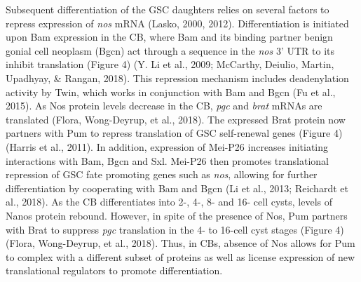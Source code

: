 \documentclass[12pt,oneside]{reedthesis}
\begin{document}
Subsequent differentiation of the GSC daughters relies on several
factors to repress expression of \emph{nos} mRNA (Lasko, 2000, 2012). Differentiation is initiated upon Bam expression in the
CB, where Bam and its binding partner benign gonial cell neoplasm (Bgcn)
act through a sequence in the \emph{nos} 3' UTR to its inhibit translation
(Figure 4) (Y. Li et al., 2009; McCarthy, Deiulio, Martin, Upadhyay, \& Rangan, 2018). This repression mechanism
includes deadenylation activity by Twin, which works in conjunction with
Bam and Bgcn (Fu et al., 2015). As Nos protein levels decrease in the CB,
\emph{pgc} and \emph{brat} mRNAs are translated (Flora, Wong-Deyrup, et al., 2018). The expressed
Brat protein now partners with Pum to repress translation of GSC
self-renewal genes (Figure 4) (Harris et al., 2011). In addition, expression
of Mei-P26 increases initiating interactions with Bam, Bgcn and Sxl.
Mei-P26 then promotes translational repression of GSC fate promoting
genes such as \emph{nos}, allowing for further differentiation by cooperating
with Bam and Bgcn (Li et al., 2013; Reichardt et al., 2018). As the CB
differentiates into 2-, 4-, 8- and 16- cell cysts, levels of Nanos
protein rebound. However, in spite of the presence of Nos, Pum partners
with Brat to suppress \emph{pgc} translation in the 4- to 16-cell cyst stages
(Figure 4) (Flora, Wong-Deyrup, et al., 2018). Thus, in CBs, absence of Nos allows for Pum
to complex with a different subset of proteins as well as license
expression of new translational regulators to promote differentiation.
\end{document}
